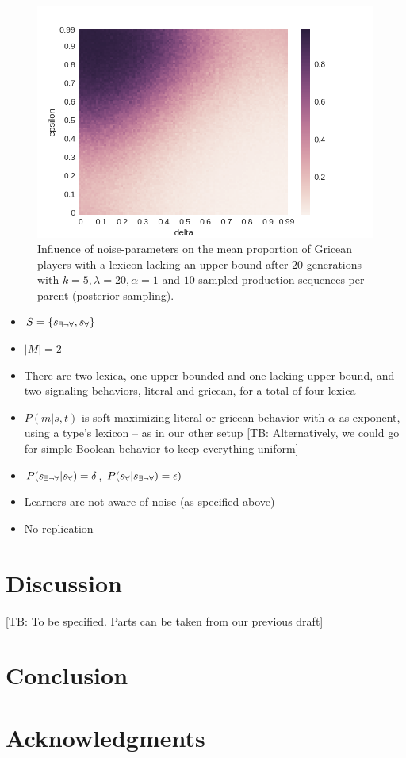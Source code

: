 \documentclass[10pt,a4paper]{article}
\newcommand{\tb}[1]{\textcolor[rgb]{.8,.33,.0}{[TB: #1]}}%
\newcommand{\state}{\ensuremath{s}\xspace}		%
\newcommand{\mystate}[1]{\ensuremath{\state_{\text{#1}}}\xspace} %
\newcommand{\ssome}{\mystate{\ensuremath{\exists\neg\forall}}}
\newcommand{\sall}{\mystate{\ensuremath{\forall}}}
\begin{document}
\begin{figure}[ht]
\centering
    \includegraphics[scale=0.5]{../code/plots/quantifiers-posterior-sampling-k5.png}
  \caption{Influence of noise-parameters on the mean proportion of Gricean players with a lexicon lacking an upper-bound after $20$ generations with $k = 5, \lambda = 20, \alpha = 1$ and $10$ sampled production sequences per parent (posterior sampling).}
  \label{fig:quant}
\end{figure}
%

\begin{itemize}
  \item $S = \{\ssome, \sall\}$
  \item $|M| = 2$
  \item There are two lexica, one upper-bounded and one lacking upper-bound, and two signaling behaviors, literal and gricean, for a total of four lexica
  \item $P(m|s,t)$ is soft-maximizing literal or gricean behavior with $\alpha$ as exponent, using a type's lexicon -- as in our other setup \tb{Alternatively, we could go for simple Boolean behavior to keep everything uniform}
  \item $P(\ssome|\sall) = \delta$, $P(\sall|\ssome) = \epsilon)$
  \item Learners are not aware of noise (as specified above)
  \item No replication
\end{itemize}



\section{Discussion}
\tb{To be specified. Parts can be taken from our previous draft} 

\section{Conclusion}


\section{Acknowledgments}





\setlength{\bibleftmargin}{.125in}
\setlength{\bibindent}{-\bibleftmargin}


\end{document}
